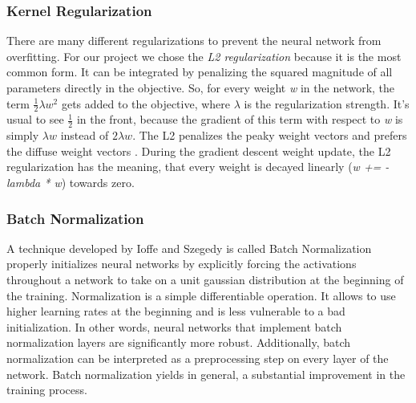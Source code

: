 \documentclass[journal]{IEEEtran}
\begin{document}
\subsubsection{Kernel Regularization}
\noindent There are many different regularizations to prevent the neural network from overfitting. For our project we chose the \textit{L2 regularization} because it is the most common form.
It can be integrated by penalizing the squared magnitude of all parameters directly in the objective. So, for every weight \textit{w} in the network, the term \(\frac{1}{2} \lambda w^2\) gets added to the objective, where \(\lambda \) is the regularization strength. It's usual to see \(\frac{1}{2}\) in the front, because the gradient of this term with respect to \textit{w} is simply \(\lambda w\) instead of \(2 \lambda w\). The L2 penalizes the peaky weight vectors and prefers the diffuse weight vectors \cite{RN4}. During the gradient descent weight update, the L2 regularization has the meaning, that every weight is decayed linearly (\textit{w += -lambda * w}) towards zero. \\
\subsubsection{Batch Normalization}
\noindent A technique developed by Ioffe and Szegedy \cite{RN4} is called Batch Normalization properly initializes neural networks by explicitly forcing the activations throughout a network to take on a unit gaussian distribution at the beginning of the training. Normalization is a simple differentiable operation. 
It allows to use higher learning rates at the beginning and is less vulnerable to a bad initialization. In other words, neural networks that implement batch normalization layers are significantly more robust. Additionally, batch normalization can be interpreted as a preprocessing step on every layer of the network. Batch normalization yields in general, a substantial improvement in the training process. \\
\end{document}
